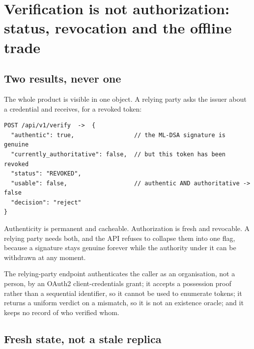 \section{Verification is not authorization: status, revocation and the offline trade}
\label{sec:authorization}



\subsection{Two results, never one}

The whole product is visible in one object. A relying party asks the issuer about a credential and
receives, for a revoked token:

\begin{lstlisting}
POST /api/v1/verify  ->  {
  "authentic": true,                 // the ML-DSA signature is genuine
  "currently_authoritative": false,  // but this token has been revoked
  "status": "REVOKED",
  "usable": false,                   // authentic AND authoritative -> false
  "decision": "reject"
}
\end{lstlisting}

Authenticity is permanent and cacheable. Authorization is fresh and revocable. A relying party needs
both, and the API refuses to collapse them into one flag, because a signature stays genuine forever
while the authority under it can be withdrawn at any moment. \sImpl

The relying-party endpoint authenticates the caller as an organisation, not a person, by an OAuth2
client-credentials grant; it accepts a possession proof rather than a sequential identifier, so it
cannot be used to enumerate tokens; it returns a uniform verdict on a mismatch, so it is not an
existence oracle; and it keeps no record of who verified whom. \sImpl

\subsection{Fresh state, not a stale replica}

